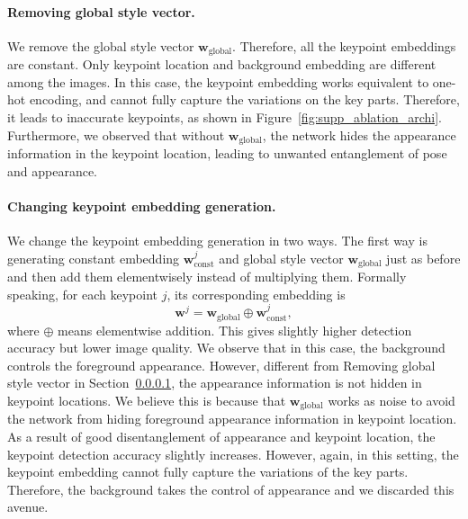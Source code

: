 \documentclass[10pt, conference, compsocconf]{IEEEtran}
\newcommand{\vw}{\mathbf{w}}
\begin{document}
\paragraph{Removing global style vector.} \label{sec:supp_removing_global} We remove the global style vector $\vw_\text{global}$. Therefore, all the keypoint embeddings are constant. Only keypoint location and background embedding are different among the images. In this case, the keypoint embedding works equivalent to one-hot encoding, and cannot fully capture the variations on the key parts. Therefore, it leads to inaccurate keypoints, as shown in Figure~\ref{fig:supp_ablation_archi}. Furthermore, we observed that without $\vw_\text{global}$, the network hides the appearance information in the keypoint location, leading to unwanted entanglement of pose and appearance.


\paragraph{Changing keypoint embedding generation.} We change the keypoint embedding generation in two ways. The first way is generating constant embedding $\vw_\text{const}^j$ and global style vector $\vw_\text{global}$ just as before and then add them elementwisely instead of multiplying them. Formally speaking, for each keypoint $j$, its corresponding embedding is
\begin{equation}
    \vw^j=\vw_\text{global} \oplus \vw^j_\text{const},
    \label{eq:noise combination add}
\end{equation}
where $\oplus$ means elementwise addition. This gives slightly higher detection accuracy but lower image quality. We observe that in this case, the background controls the foreground appearance. However, different from Removing global style vector in Section~\ref{sec:supp_removing_global}, the appearance information is not hidden in keypoint locations. We believe this is because that $\vw_\text{global}$ works as noise to avoid the network from hiding foreground appearance information in keypoint location. As a result of good disentanglement of appearance and keypoint location, the keypoint detection accuracy slightly increases. However, again, in this setting, the keypoint embedding cannot fully capture the variations of the key parts. Therefore, the background takes the control of appearance and we discarded this avenue.
\end{document}

